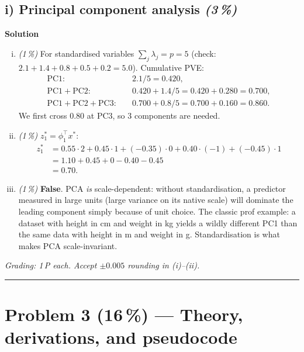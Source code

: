 \documentclass[11pt,a4paper]{article}
\newcommand{\points}[1]{\textbf{(#1\,\%)}}
\newcommand{\subpoints}[1]{\textit{(#1\,\%)}}
\newcommand{\sol}{\noindent\textbf{Solution}}
\begin{document}
\subsection*{i) Principal component analysis \subpoints{3}}
\sol{}
\begin{enumerate}[(i)]
  \item \subpoints{1} For standardised variables $\sum_j\lambda_j = p = 5$ (check:
        $2.1+1.4+0.8+0.5+0.2 = 5.0$). Cumulative PVE:
        \begin{align*}
        \mathrm{PC1}: &\quad 2.1/5 = 0.420, \\
        \mathrm{PC1\!+\!PC2}: &\quad 0.420 + 1.4/5 = 0.420 + 0.280 = 0.700, \\
        \mathrm{PC1\!+\!PC2\!+\!PC3}: &\quad 0.700 + 0.8/5 = 0.700 + 0.160 = 0.860.
        \end{align*}
        We first cross $0.80$ at $\mathrm{PC3}$, so $\boxed{3}$ components are needed.
  \item \subpoints{1} $z_1^* = \phi_1^\top x^*$:
        \begin{align*}
        z_1^* &= 0.55\cdot 2 + 0.45\cdot 1 + (-0.35)\cdot 0 + 0.40\cdot(-1) + (-0.45)\cdot 1 \\
              &= 1.10 + 0.45 + 0 - 0.40 - 0.45 \\
              &= \boxed{0.70}.
        \end{align*}
  \item \subpoints{1} \textbf{False}. PCA \emph{is} scale-dependent: without standardisation, a
        predictor measured in large units (large variance on its native scale) will dominate the
        leading component simply because of unit choice. The classic prof example: a dataset with
        height in cm and weight in kg yields a wildly different PC1 than the same data with height
        in m and weight in g. Standardisation is what makes PCA scale-invariant.
\end{enumerate}

\noindent\emph{Grading: 1\,P each. Accept $\pm 0.005$ rounding in (i)--(ii).}

\vspace{0.6em}
\hrule
\vspace{1em}

\section*{Problem 3 \points{16} --- Theory, derivations, and pseudocode}
\end{document}

